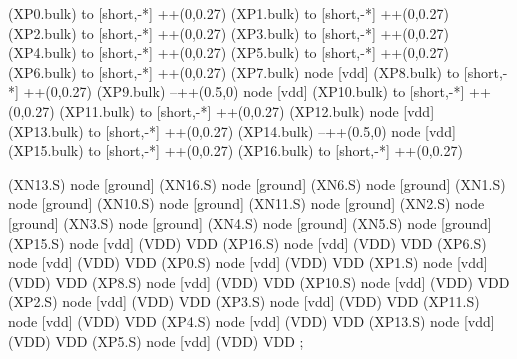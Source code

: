 \begin{circuitikz}[american]
	(XP0.bulk) to [short,-*] ++(0,0.27)
	(XP1.bulk) to [short,-*] ++(0,0.27)	
	(XP2.bulk) to [short,-*] ++(0,0.27)
	(XP3.bulk) to [short,-*] ++(0,0.27)	
	(XP4.bulk) to [short,-*] ++(0,0.27)
	(XP5.bulk) to [short,-*] ++(0,0.27)
	(XP6.bulk) to [short,-*] ++(0,0.27)	
	(XP7.bulk) node [vdd] {}	
	(XP8.bulk) to [short,-*] ++(0,0.27)
	(XP9.bulk) --++(0.5,0) node [vdd] {}
	(XP10.bulk) to [short,-*] ++(0,0.27)
	(XP11.bulk) to [short,-*] ++(0,0.27)
	(XP12.bulk) node [vdd] {}
	(XP13.bulk) to [short,-*] ++(0,0.27)
	(XP14.bulk) --++(0.5,0) node [vdd] {}
	(XP15.bulk) to [short,-*] ++(0,0.27)
	(XP16.bulk) to [short,-*] ++(0,0.27)	


	(XN13.S) node [ground] {}
	(XN16.S) node [ground] {}
	(XN6.S) node [ground] {}
	(XN1.S) node [ground] {}
	(XN10.S) node [ground] {}
	(XN11.S) node [ground] {}
	(XN2.S) node [ground] {}
	(XN3.S) node [ground] {}
	(XN4.S) node [ground] {}
	(XN5.S) node [ground] {}
	(XP15.S) node [vdd] (VDD) {VDD}
	(XP16.S) node [vdd] (VDD) {VDD}
	(XP6.S) node [vdd] (VDD) {VDD}
	(XP0.S) node [vdd] (VDD) {VDD}
	(XP1.S) node [vdd] (VDD) {VDD}
	(XP8.S) node [vdd] (VDD) {VDD}
	(XP10.S) node [vdd] (VDD) {VDD}
	(XP2.S) node [vdd] (VDD) {VDD}
	(XP3.S) node [vdd] (VDD) {VDD}
	(XP11.S) node [vdd] (VDD) {VDD}
	(XP4.S) node [vdd] (VDD) {VDD}
	(XP13.S) node [vdd] (VDD) {VDD}
	(XP5.S) node [vdd] (VDD) {VDD}
;

\end{circuitikz}
